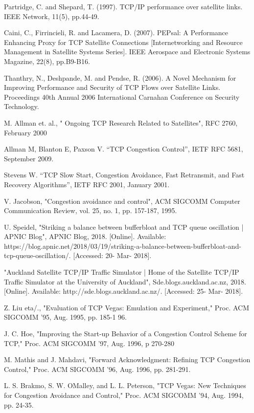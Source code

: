  Partridge, C. and Shepard, T. (1997). TCP/IP performance over satellite links. IEEE Network, 11(5), pp.44-49.

 Caini, C., Firrincieli, R. and Lacamera, D. (2007). PEPsal: A Performance Enhancing Proxy for TCP Satellite Connections [Internetworking and Resource Management in Satellite Systems Series]. IEEE Aerospace and Electronic Systems Magazine, 22(8), pp.B9-B16.

  Thanthry, N., Deshpande, M. and Pendse, R. (2006). A Novel Mechanism for Improving Performance and Security of TCP Flows over Satellite Links. Proceedings 40th Annual 2006 International Carnahan Conference on Security Technology.

 M. Allman et. al., " Ongoing TCP Research Related to Satellites", RFC 2760, February 2000 

 Allman M, Blanton E, Paxson V. “TCP Congestion Control”, IETF RFC 5681, September 2009. 

 Stevens W. “TCP Slow Start, Congestion Avoidance, Fast Retransmit, and Fast Recovery Algorithms”, IETF RFC 2001, January 2001. 

 V. Jacobson, "Congestion avoidance and control", ACM SIGCOMM Computer Communication Review, vol. 25, no. 1, pp. 157-187, 1995. 

 U. Speidel, "Striking a balance between bufferbloat and TCP queue oscillation | APNIC Blog", APNIC Blog, 2018. [Online]. Available: https://blog.apnic.net/2018/03/19/striking-a-balance-between-bufferbloat-and-tcp-queue-oscillation/. [Accessed: 20- Mar- 2018].

 "Auckland Satellite TCP/IP Traffic Simulator | Home of the Satellite TCP/IP Traffic Simulator at the University of Auckland", Sde.blogs.auckland.ac.nz, 2018. [Online]. Available: http://sde.blogs.auckland.ac.nz/. [Accessed: 25- Mar- 2018].

 Z. Liu eta/., "Evaluation of TCP Vegas: Emulation and Experiment," Proc. ACM SIGCOMM '95, Aug. 1995, pp. 185-1 96.

 J. C. Hoe, "Improving the Start-up Behavior of a Congestion Control Scheme for TCP," Proc. ACM SIGCOMM '97, Aug. 1996, p 270-280 

 M. Mathis and J. Mahdavi, "Forward Acknowledgment: Refining TCP Congestion Control," Proc. ACM SIGCOMM '96, Aug. 1996, pp. 281-291.

 L. S. Brakmo, S. W. OMalley, and L. L. Peterson, "TCP Vegas: New Techniques for Congestion Avoidance and Control," Proc. ACM SIGCOMM '94,
Aug. 1994, pp. 24-35.


